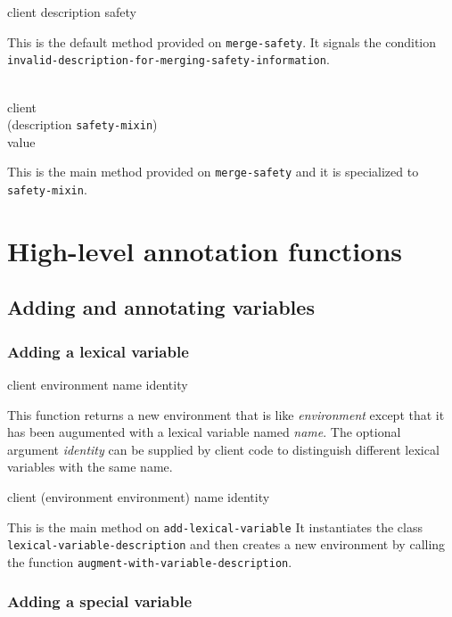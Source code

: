 {\footnotesize
{} {client description safety}
}

This is the default method provided on \texttt{merge-safety}.  It
signals the condition
\texttt{invalid-description-for-merging-safety-information}.

{\footnotesize
{}\\
           {client\\
            (description {\tt safety-mixin})\\
            value}
}

This is the main method provided on \texttt{merge-safety} and it is
specialized to \texttt{safety-mixin}.

\section{High-level annotation functions}

\subsection{Adding and annotating variables}

\subsubsection{Adding a lexical variable}

{\footnotesize
{} {client environment name \optional identity}
}

This function returns a new environment that is like
\textit{environment} except that it has been augumented with a lexical
variable named \textit{name}.  The optional argument \textit{identity}
can be supplied by client code to distinguish different lexical
variables with the same name.

{\footnotesize
{}
{client
 (environment environment)
 name
 \optional identity}
}

This is the main method on \texttt{add-lexical-variable} It
instantiates the class \texttt{lexical-variable-description} and then
creates a new environment by calling the function
\texttt{augment-with-variable-description}.

\subsubsection{Adding a special variable}

